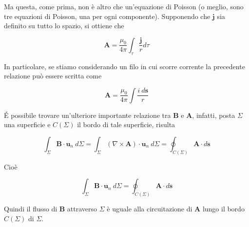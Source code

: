 Ma questa, come prima, non è altro che un'equazione di Poisson (o meglio, sono tre equazioni di Poisson, una per ogni componente). Supponendo che $\mathbf{j}$ sia definito su tutto lo spazio, si ottiene che 

\begin{tcolorbox}[colback=yellow!10!white, colframe=orange!70!black, boxrule=0.8pt]
\begin{equation} \label{eq:forma_esplicita_potenziale_vet}
    \mathbf{A} = \frac{\mu_0}{4 \pi} \int_{\tau} \frac{\mathbf{j}}{r} d \tau
\end{equation}
\end{tcolorbox}

In particolare, se stiamo considerando un filo in cui scorre corrente la precedente relazione può essere scritta come 

\begin{tcolorbox}[colback=yellow!10!white, colframe=orange!70!black, boxrule=0.8pt]
\begin{equation}
    \mathbf{A} = \frac{\mu_0}{4 \pi} \int \frac{i \ d \mathbf{s}}{r} 
\end{equation}
\end{tcolorbox}

\'E possibile trovare un'ulteriore importante relazione tra $\mathbf{B}$ e $\mathbf{A}$, infatti, posta $\Sigma$ una superficie e $C(\Sigma)$ il bordo di tale superficie, risulta

\begin{equation*}
    \int_{\Sigma} \mathbf{B} \cdot  \mathbf{u}_n \ d \Sigma  = \int_{\Sigma} (\nabla \times \mathbf{A}) \cdot \mathbf{u}_n \ d\Sigma = \oint_{C(\Sigma)} \mathbf{A} \cdot d \mathbf{s}
\end{equation*}

Cioè

\begin{tcolorbox}[colback=yellow!10!white, colframe=orange!70!black, boxrule=0.8pt]
\begin{equation}
    \int_{\Sigma} \mathbf{B} \cdot  \mathbf{u}_n \ d \Sigma = \oint_{C(\Sigma)} \mathbf{A} \cdot d \mathbf{s} 
\end{equation}
\end{tcolorbox}

Quindi il flusso di $\mathbf{B}$ attraverso $\Sigma$ è uguale alla circuitazione di $\mathbf{A}$ lungo il bordo $C(\Sigma)$ di $\Sigma$. 

